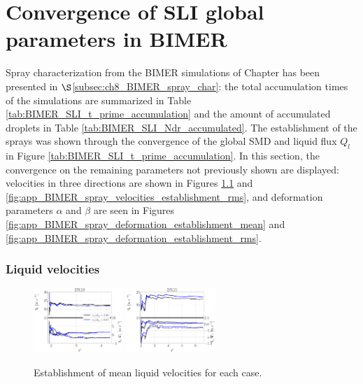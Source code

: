 \chapter{Convergence of SLI global parameters in BIMER}
\label{app:BIMER_SLI_convergence}

Spray characterization from the BIMER simulations of Chapter has been presented in $\S$\ref{subsec:ch8_BIMER_spray_char}: the total accumulation times of the simulations are summarized in Table \ref{tab:BIMER_SLI_t_prime_accumulation} and the amount of accumulated droplets in Table \ref{tab:BIMER_SLI_Ndr_accumulated}. The establishment of the sprays was shown through the convergence of the global SMD and liquid flux $Q_l$ in Figure \ref{tab:BIMER_SLI_t_prime_accumulation}. In this section, the convergence on the remaining parameters not previously shown are displayed: velocities in three directions are shown in Figures \ref{fig:app_BIMER_spray_velocities_establishment_mean} and \ref{fig:app_BIMER_spray_velocities_establishment_rms}, and deformation parameters $\alpha$ and $\beta$ are seen in Figures \ref{fig:app_BIMER_spray_deformation_establishment_mean} and \ref{fig:app_BIMER_spray_deformation_establishment_rms}.



\subsection*{Liquid velocities}

\begin{figure}[ht]
	\centering
   \includegraphics[width=0.3\textwidth]{./part3_applications/figures_ch8_resolved/SPRAY_characterization/velocities/establishment_DX10_mean}
   \includegraphics[width=0.3\textwidth]{./part3_applications/figures_ch8_resolved/SPRAY_characterization/velocities/establishment_DX15_mean}
   \caption{Establishment of mean liquid velocities for each case.}
\label{fig:app_BIMER_spray_velocities_establishment_mean}
\end{figure}

